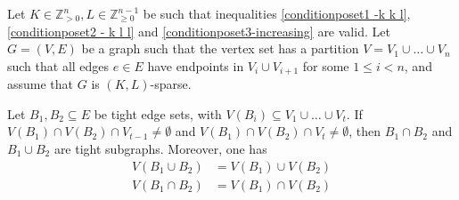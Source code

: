 \documentclass{article}
\begin{document}
\begin{lemma}\label{blocks}
Let $K\in \mathbb{Z}_{>0}^{n}, L\in \mathbb{Z}_{\geq 0}^{n-1}$ be such that inequalities \eqref{conditionposet1 -k k l}, \eqref{conditionposet2 - k l l} and \eqref{conditionposet3-increasing} are valid. Let $G=(V,E)$ be a graph such that the vertex set has a partition $V=V_1\cup \dots \cup V_n$ such that all edges $e\in E$ have endpoints in $V_{i} \cup V_{i+1}$ for some $1 \leq i < n$, and assume that $G$ is $(K,L)$-sparse. 

Let $B_1, B_2 \subseteq E$ be tight edge sets, with $V(B_i)\subseteq V_1\cup \dots \cup V_t$. If $V(B_1)\cap V(B_2) \cap V_{t-1} \neq \emptyset$ and $V(B_1)\cap V(B_2) \cap V_{t} \neq \emptyset$, then $B_1 \cap B_2$ and $B_1\cup B_2$ are tight subgraphs.
Moreover, one has
\begin{align*}
    V(B_1\cup B_2) &= V(B_1) \cup V(B_2)\\
    V(B_1\cap B_2) &= V(B_1) \cap V(B_2)
\end{align*}
\end{lemma}
\end{document}
